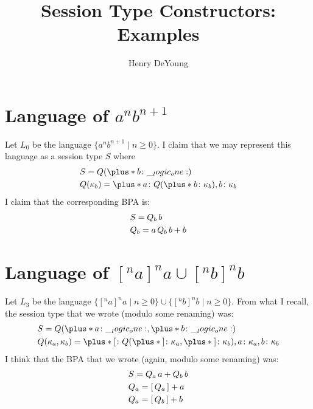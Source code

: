 \documentclass[tufte-handout]{tufte-thesis}
\begin{document}
\title{Session Type Constructors: Examples}
\author{Henry DeYoung}
\maketitle

\section{Language of $a^nb^{n+1}$}

Let $L_0$ be the language $\{ a^nb^{n+1} \mid n \geq 0 \}$.
I claim that we may represent this language as a session type $S$ where
\begin{equation*}
  \begin{lgathered}
    S = Q(\plus*{b\colon \one}) \\
    Q(\kappa_b) = \plus*{a\colon Q(\plus*{b\colon \kappa_b}), b\colon \kappa_b}
  \end{lgathered}
\end{equation*}
I claim that the corresponding BPA is:
\begin{equation*}
  \begin{lgathered}
    S = Q_b\,b \\
    Q_b = a\,Q_b\,b + b
  \end{lgathered}
\end{equation*}

\section{Language of $[^na]^na \cup [^nb]^nb$}

Let $L_3$ be the language $\{ [^na]^na \mid n \geq 0 \} \cup \{ [^nb]^nb \mid n \geq 0 \}$.
From what I recall, the session type that we wrote (modulo some renaming) was:
\begin{equation*}
  \begin{lgathered}
    S = Q(\plus*{a\colon \one} , \plus*{b\colon \one}) \\
    Q(\kappa_a, \kappa_b) = \plus*{[\colon Q(\plus*{]\colon \kappa_a}, \plus*{]\colon \kappa_b}), a\colon \kappa_a, b\colon \kappa_b}
  \end{lgathered}
\end{equation*}
I think that the BPA that we wrote (again, modulo some renaming) was:
\begin{equation*}
  \begin{lgathered}
    S = Q_a\,a + Q_b\,b \\
    Q_a = [\,Q_a\,] + a \\
    Q_a = [\,Q_b\,] + b
  \end{lgathered}
\end{equation*}
\end{document}
